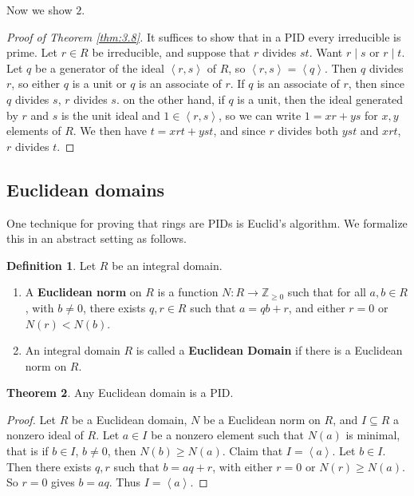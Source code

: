 \documentclass{article}
\newcommand{\Z}{\mathbb{Z}}
\newcommand{\rb}[1]{\left( #1 \right)}
\newcommand{\ab}[1]{\left\langle #1 \right\rangle}
\theoremstyle{definition}\newtheorem{definition}{Definition}[section]
\theoremstyle{definition}\newtheorem{remark}[definition]{Remark}
\theoremstyle{definition}\newtheorem*{example}{Example}
\theoremstyle{definition}\newtheorem*{note}{Note}
\newtheorem{theorem}[definition]{Theorem}
\begin{document}
Now we show $ 2 $.

\begin{proof}[Proof of Theorem \ref{thm:3.8}]
It suffices to show that in a PID every irreducible is prime. Let $ r \in R $ be irreducible, and suppose that $ r $ divides $ st $. Want $ r \mid s $ or $ r \mid t $. Let $ q $ be a generator of the ideal $ \ab{r, s} $ of $ R $, so $ \ab{r, s} = \ab{q} $. Then $ q $ divides $ r $, so either $ q $ is a unit or $ q $ is an associate of $ r $. If $ q $ is an associate of $ r $, then since $ q $ divides $ s $, $ r $ divides $ s $. on the other hand, if $ q $ is a unit, then the ideal generated by $ r $ and $ s $ is the unit ideal and $ 1 \in \ab{r, s} $, so we can write $ 1 = xr + ys $ for $ x, y $ elements of $ R $. We then have $ t = xrt + yst $, and since $ r $ divides both $ yst $ and $ xrt $, $ r $ divides $ t $.
\end{proof}


\subsection{Euclidean domains}

One technique for proving that rings are PIDs is Euclid's algorithm. We formalize this in an abstract setting as follows.

\begin{definition}
Let $ R $ be an integral domain.
\begin{enumerate}
\item A \textbf{Euclidean norm} on $ R $ is a function $ N : R \to \Z_{\ge 0} $ such that for all $ a, b \in R $, with $ b \ne 0 $, there exists $ q, r \in R $ such that $ a = qb + r $, and either $ r = 0 $ or $ N\rb{r} < N\rb{b} $.
\item An integral domain $ R $ is called a \textbf{Euclidean Domain} if there is a Euclidean norm on $ R $.
\end{enumerate}
\end{definition}

\begin{theorem}
Any Euclidean domain is a PID.
\end{theorem}

\begin{proof}
Let $ R $ be a Euclidean domain, $ N $ be a Euclidean norm on $ R $, and $ I \subseteq R $ a nonzero ideal of $ R $. Let $ a \in I $ be a nonzero element such that $ N\rb{a} $ is minimal, that is if $ b \in I $, $ b \ne 0 $, then $ N\rb{b} \ge N\rb{a} $. Claim that $ I = \ab{a} $. Let $ b \in I $. Then there exists $ q, r $ such that $ b = aq + r $, with either $ r = 0 $ or $ N\rb{r} \ge N\rb{a} $. So $ r = 0 $ gives $ b = aq $. Thus $ I = \ab{a} $.
\end{proof}
\end{document}
